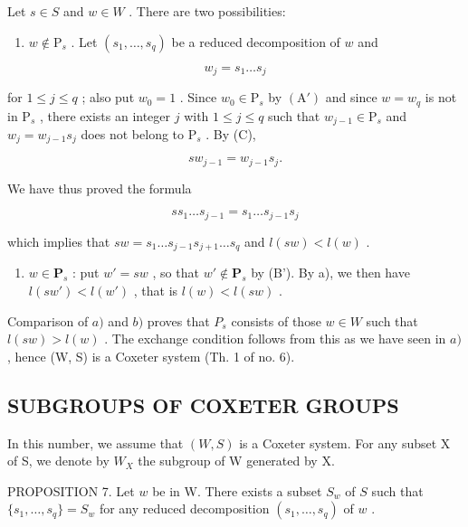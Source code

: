 Let \(s \in S\) and \(w \in W\) . There are two possibilities:

\begin{enumerate}
\def\labelenumi{\alph{enumi})}
\tightlist
\item
  \(w \notin \mathrm{P}_s\) . Let \((s_1, \ldots, s_q)\) be a reduced decomposition of \(w\) and
\end{enumerate}

\[
w _ {j} = s _ {1} \dots s _ {j}
\]

for \(1 \leqslant j \leqslant q\) ; also put \(w_0 = 1\) . Since \(w_0 \in \mathrm{P}_s\) by \((\mathrm{A}')\) and since \(w = w_q\) is not in \(\mathrm{P}_s\) , there exists an integer \(j\) with \(1 \leqslant j \leqslant q\) such that \(w_{j-1} \in \mathrm{P}_s\) and \(w_j = w_{j-1}s_j\) does not belong to \(\mathrm{P}_s\) . By (C),

\[
s w _ {j - 1} = w _ {j - 1} s _ {j}.
\]

We have thus proved the formula

\[
s s _ {1} \dots s _ {j - 1} = s _ {1} \dots s _ {j - 1} s _ {j}
\]

which implies that \(sw = s_1 \ldots s_{j-1}s_{j+1} \ldots s_q\) and \(l(sw) < l(w)\) .

\begin{enumerate}
\def\labelenumi{\alph{enumi})}
\setcounter{enumi}{1}
\tightlist
\item
  \(w \in \mathbf{P}_s\) : put \(w' = sw\) , so that \(w' \notin \mathbf{P}_s\) by (B'). By a), we then have \(l(sw') < l(w')\) , that is \(l(w) < l(sw)\) .
\end{enumerate}

Comparison of \(a)\) and \(b)\) proves that \(P_s\) consists of those \(w \in W\) such that \(l(sw) > l(w)\) . The exchange condition follows from this as we have seen in \(a)\) , hence (W, S) is a Coxeter system (Th. 1 of no. 6).

\subsection{SUBGROUPS OF COXETER GROUPS}

In this number, we assume that \((W, S)\) is a Coxeter system. For any subset X of S, we denote by \(W_{X}\) the subgroup of W generated by X.

PROPOSITION 7. Let \(w\) be in W. There exists a subset \(S_w\) of \(S\) such that \(\{s_1, \ldots, s_q\} = S_w\) for any reduced decomposition \((s_1, \ldots, s_q)\) of \(w\) .

